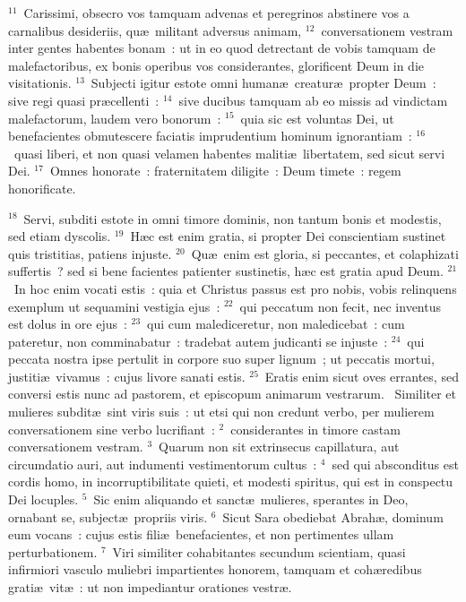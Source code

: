 ${}^{11}$~Carissimi, obsecro vos tamquam advenas et peregrinos abstinere vos a carnalibus desideriis, qu\ae\ militant adversus animam,
${}^{12}$~conversationem vestram inter gentes habentes bonam~: ut in eo quod detrectant de vobis tamquam de malefactoribus, ex bonis operibus vos considerantes, glorificent Deum in die visitationis.
${}^{13}$~Subjecti igitur estote omni human\ae\ creatur\ae\ propter Deum~: sive regi quasi pr\ae cellenti~:
${}^{14}$~sive ducibus tamquam ab eo missis ad vindictam malefactorum, laudem vero bonorum~:
${}^{15}$~quia sic est voluntas Dei, ut benefacientes obmutescere faciatis imprudentium hominum ignorantiam~:
${}^{16}$~quasi liberi, et non quasi velamen habentes maliti\ae\ libertatem, sed sicut servi Dei.
${}^{17}$~Omnes honorate~: fraternitatem diligite~: Deum timete~: regem honorificate.


${}^{18}$~Servi, subditi estote in omni timore dominis, non tantum bonis et modestis, sed etiam dyscolis.
${}^{19}$~H\ae c est enim gratia, si propter Dei conscientiam sustinet quis tristitias, patiens injuste.
${}^{20}$~Qu\ae\ enim est gloria, si peccantes, et colaphizati suffertis~? sed si bene facientes patienter sustinetis, h\ae c est gratia apud Deum.
${}^{21}$~In hoc enim vocati estis~: quia et Christus passus est pro nobis, vobis relinquens exemplum ut sequamini vestigia ejus~:
${}^{22}$~qui peccatum non fecit, nec inventus est dolus in ore ejus~:
${}^{23}$~qui cum malediceretur, non maledicebat~: cum pateretur, non comminabatur~: tradebat autem judicanti se injuste~:
${}^{24}$~qui peccata nostra ipse pertulit in corpore suo super lignum~; ut peccatis mortui, justiti\ae\ vivamus~: cujus livore sanati estis.
${}^{25}$~Eratis enim sicut oves errantes, sed conversi estis nunc ad pastorem, et episcopum animarum vestrarum.
~Similiter et mulieres subdit\ae\ sint viris suis~: ut etsi qui non credunt verbo, per mulierem conversationem sine verbo lucrifiant~:
${}^{2}$~considerantes in timore castam conversationem vestram.
${}^{3}$~Quarum non sit extrinsecus capillatura, aut circumdatio auri, aut indumenti vestimentorum cultus~:
${}^{4}$~sed qui absconditus est cordis homo, in incorruptibilitate quieti, et modesti spiritus, qui est in conspectu Dei locuples.
${}^{5}$~Sic enim aliquando et sanct\ae\ mulieres, sperantes in Deo, ornabant se, subject\ae\ propriis viris.
${}^{6}$~Sicut Sara obediebat Abrah\ae , dominum eum vocans~: cujus estis fili\ae\ benefacientes, et non pertimentes ullam perturbationem.
${}^{7}$~Viri similiter cohabitantes secundum scientiam, quasi infirmiori vasculo muliebri impartientes honorem, tamquam et coh\ae redibus grati\ae\ vit\ae~: ut non impediantur orationes vestr\ae .



